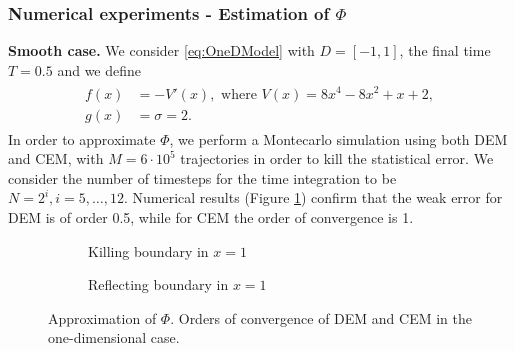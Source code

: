 \subsubsection{Numerical experiments - Estimation of $\Phi$}

\textbf{Smooth case.} We consider \eqref{eq:OneDModel} with $D = \left[ -1, 1 \right]$, the final time $T = 0.5$ and we define
\begin{align}\label{eq:FunctionsOneDSmoothPhi}
\begin{split}
	f(x) &= -V'(x), \text{ where } V(x) = 8x^4 - 8x^2 + x + 2, \\
	g(x) &= \sigma = 2.
\end{split}
\end{align}
In order to approximate $\Phi$, we perform a Montecarlo simulation using both DEM and CEM, with $M = 6 \cdot 10^5$ trajectories in order to kill the statistical error. We consider the number of timesteps for the time integration to be $N = 2^i, i = 5, \dots, 12$. Numerical results (Figure \ref{fig:KillOneDPhi}) confirm that the weak error for DEM is of order 0.5, while for CEM the order of convergence is 1.

\begin{figure}[t]
    \centering
    \begin{subfigure}{0.49\linewidth}
        \centering
        \resizebox{1\linewidth}{!}{ }  
        \caption{Killing boundary in $x = 1$}
        \label{fig:KillOneDPhi}
    \end{subfigure}
    \begin{subfigure}{0.49\linewidth}
        \centering
        \resizebox{1\linewidth}{!}{ }  
        \caption{Reflecting boundary in $x = 1$}
        \label{fig:ReflectOneDPhi}
    \end{subfigure}    
    \caption{Approximation of $\Phi$. Orders of convergence of DEM and CEM in the one-dimensional case.}
    \label{fig:OrdersOneDPhi}
\end{figure}


